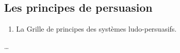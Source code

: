 \documentclass[10pt,a5paper,twoside]{article}
\begin{document}
\subsection{Les principes de
persuasion}\label{les-principes-de-persuasion}

\begin{enumerate}
\def\labelenumi{\arabic{enumi}.}
\itemsep1pt\parskip0pt
\item
  La Grille de principes des systèmes ludo-persuasifs.
\end{enumerate}

\ldots{}

\newpage


\end{document}
